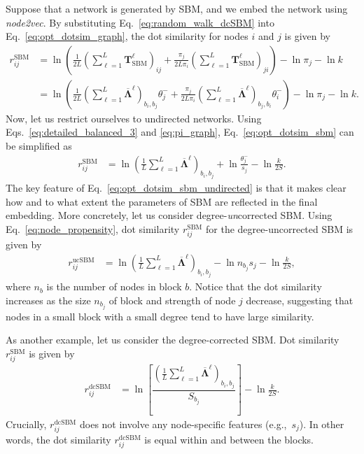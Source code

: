 \documentclass[12pt]{article} %
\def\eg{e.g.,~}
\def\mat#1{\mathbf{#1}}
\begin{document}
Suppose that a network is generated by SBM, and we embed the network using \textit{node2vec}.
By substituting Eq.~\eqref{eq:random_walk_dcSBM} into Eq.~\eqref{eq:opt_dotsim_graph}, the dot similarity for nodes $i$ and $j$ is given by
\begin{align}
    \label{eq:opt_dotsim_sbm}
    r^{\text{SBM}} _{ij}
    &= \ln \left( \frac{1}{2L}\left(\sum_{\ell=1}^L \mat{T}^\ell _{\text{SBM}}\right)_{ij} + \frac{\pi _j}{2L\pi _i}\left( \sum_{\ell=1}^L \mat{T}^\ell _{\text{SBM}}\right)_{ji} \right) - \ln \pi_j -\ln k \nonumber \\
    & = \ln \left( \frac{1}{2L}\left(\sum_{\ell=1}^L \mat{\overline \Lambda}^\ell \right)_{b_i, b_j}\theta^{-} _j + \frac{\pi _j}{2L\pi _i}\left( \sum_{\ell=1}^L \mat{\overline \Lambda}^\ell \right)_{b_j,b_i} \theta^{-} _i \right) - \ln \pi_j -\ln k.
\end{align}
Now, let us restrict ourselves to undirected networks.
Using Eqs.~\eqref{eq:detailed_balanced_3} and \eqref{eq:pi_graph}, Eq.~\eqref{eq:opt_dotsim_sbm} can be simplified as
\begin{align}
    \label{eq:opt_dotsim_sbm_undirected}
    r^{\text{SBM}} _{ij}
    & = \ln \left(\frac{1}{L}\sum_{\ell=1}^L \mat{\overline \Lambda}^\ell \right)_{b_i, b_j} + \ln \frac{\theta^{-} _j}{s_j} - \ln\frac{k}{2S}.
\end{align}
The key feature of Eq.~\eqref{eq:opt_dotsim_sbm_undirected} is that it makes clear how and to what extent the parameters of SBM are reflected in the final embedding.
More concretely, let us consider degree-\textit{un}corrected SBM.
Using Eq.~\eqref{eq:node_propensity}, dot similarity $r_{ij}^{\text{SBM}}$ for the degree-uncorrected SBM is given by
\begin{align}
    \label{eq:opt_dotsim_ucsbm_undirected}
    r^{\text{ucSBM}} _{ij}
    & = \ln \left(\frac{1}{L}\sum_{\ell=1}^L \mat{\overline \Lambda}^\ell \right)_{b_i, b_j} - \ln n_{b_j}s_j- \ln\frac{k}{2S},
\end{align}
where $n_{b}$ is the number of nodes in block $b$.
Notice that the dot similarity increases as the size $n_{b_j}$ of block and strength of node $j$ decrease, suggesting that nodes in a small block with a small degree tend to have large similarity.

As another example, let us consider the degree-corrected SBM.
Dot similarity $r_{ij}^{\text{SBM}}$ is given by
\begin{align}
    \label{eq:opt_dotsim_dcsbm_undirected}
    r^{\text{dcSBM}} _{ij}
    & = \ln \left[\dfrac{\left(\frac{1}{L}\sum_{\ell=1}^L \mat{\overline \Lambda}^\ell \right)_{b_i, b_j}}{S_{b_j}}\right] - \ln\frac{k}{2S}.
\end{align}
Crucially, $r^{\text{dcSBM}}_{ij}$ does not involve any node-specific features (\eg $s_j$). In other words, the dot similarity $r^{\text{dcSBM}} _{ij}$ is equal within and between the blocks.
\end{document}
